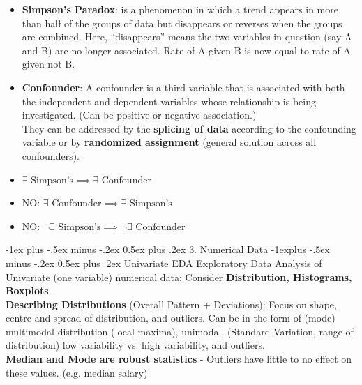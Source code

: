 \documentclass[10pt, landscape]{article}
\makeatletter
\renewcommand{\section}{\@startsection{section}{1}{0mm}%
                                {-1ex plus -.5ex minus -.2ex}%
                                {0.5ex plus .2ex}%
                                {\normalfont\large\bfseries}}
\renewcommand{\subsection}{\@startsection{subsection}{2}{0mm}%
                                {-1explus -.5ex minus -.2ex}%
                                {0.5ex plus .2ex}%
                                {\normalfont\normalsize\bfseries}}
\makeatother
\begin{document}
\begin{multicols*}{3}
\begin{itemize}
	\item \textbf{Simpson's Paradox}: is a phenomenon in which a trend appears in more than half of the groups of data but disappears or reverses when the groups are combined. Here, “disappears” means the two variables in question (say A and B) are no longer associated. Rate of A given B is now equal to rate of A given not B. 
	\item \textbf{Confounder}: A confounder is a third variable that is associated with both the independent and
dependent variables whose relationship is being investigated. (Can be positive or negative association.) \\
They can be addressed by the \textbf{splicing of data} according to the confounding variable or by \textbf{randomized assignment} (general solution across all confounders). 
    \item $\exists\text{ Simpson's} \implies \exists \text{ Confounder}$
    \item NO: $\exists\text{ Confounder} \implies \exists \text{ Simpson's}$
    \item NO: $\neg\exists\text{ Simpson's} \implies \neg\exists \text{ Confounder}$
\end{itemize}

\section{3. Numerical Data}
\subsection{Univariate EDA}
	Exploratory Data Analysis of Univariate (one variable) numerical data: Consider \textbf{Distribution, Histograms, Boxplots}. \\
	\textbf{Describing Distributions} (Overall Pattern + Deviations): Focus on shape, centre and spread of distribution, and outliers. Can be in the form of (mode) multimodal distribution (local maxima), unimodal, (Standard Variation, range of distribution) low variability vs. high variability, and outliers. \\
	\textbf{Median and Mode are robust statistics} - Outliers have little to no effect on these values. (e.g. median salary) 

\end{multicols*}
\end{document}
